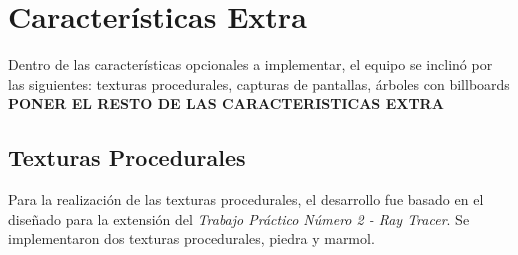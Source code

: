 \documentclass[a4paper,10pt]{article}
\begin{document}
\section{Características Extra}
\label{caracteristicas}

Dentro de las características opcionales a implementar, el equipo se inclinó
por las siguientes: texturas procedurales, capturas de pantallas, árboles con
billboards \textbf{PONER EL RESTO DE LAS CARACTERISTICAS EXTRA}

\subsection{Texturas Procedurales}

Para la realización de las texturas procedurales, el desarrollo fue basado en
el diseñado para la extensión del \textit{Trabajo Práctico Número 2 - Ray
Tracer}.  Se implementaron dos texturas procedurales, piedra y marmol.
\end{document}
